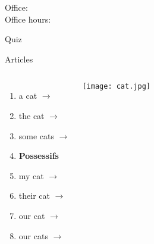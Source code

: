 \documentclass{beamer}
\subtitle[Famille et adjectifs possessifs]{La famille et les adjectifs possessifs}
\begin{document}
  \begin{frame}
    \titlepage
    \tiny{Office: \\
          Office hours: }
  \end{frame}

  \begin{frame}{}
    \begin{center}
      \Large Quiz
    \end{center}
  \end{frame}

  \begin{frame}{Articles }
    \begin{columns}
        \begin{enumerate}
          \item a cat $\to$ \underline{}
          \item the cat $\to$ \underline{}
          \item some cats $\to$ \underline{}
          \item[] \textbf{Possessifs}
          \item my cat $\to$ \underline{}
          \item their cat $\to$ \underline{}
          \item our cat $\to$ \underline{}
          \item our cat\alert{s} $\to$ \underline{}
        \end{enumerate}
        \texttt{[image: cat.jpg]}
    \end{columns}
  \end{frame}
\end{document}
